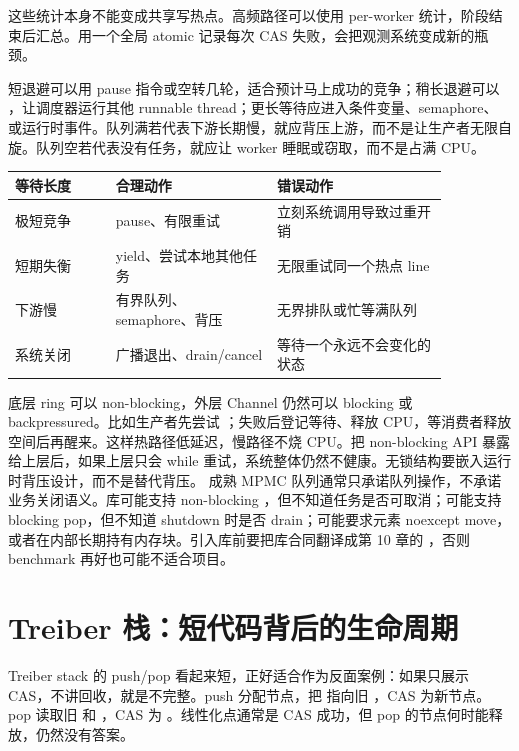 这些统计本身不能变成共享写热点。高频路径可以使用 per-worker 统计，阶段结束后汇总。用一个全局 atomic 记录每次 CAS 失败，会把观测系统变成新的瓶颈。

短退避可以用 pause 指令或空转几轮，适合预计马上成功的竞争；稍长退避可以 ，让调度器运行其他 runnable thread；更长等待应进入条件变量、semaphore、 或运行时事件。队列满若代表下游长期慢，就应背压上游，而不是让生产者无限自旋。队列空若代表没有任务，就应让 worker 睡眠或窃取，而不是占满 CPU。

\begin{center}
\begin{tabular}{p{0.20\linewidth}p{0.32\linewidth}p{0.34\linewidth}}
\toprule
等待长度 & 合理动作 & 错误动作 \\
\midrule
极短竞争 & pause、有限重试 & 立刻系统调用导致过重开销 \\
短期失衡 & yield、尝试本地其他任务 & 无限重试同一个热点 line \\
下游慢 & 有界队列、semaphore、背压 & 无界排队或忙等满队列 \\
系统关闭 & 广播退出、drain/cancel & 等待一个永远不会变化的状态 \\
\bottomrule
\end{tabular}
\end{center}

底层 ring 可以 non-blocking，外层 Channel 仍然可以 blocking 或 backpressured。比如生产者先尝试 ；失败后登记等待、释放 CPU，等消费者释放空间后再醒来。这样热路径低延迟，慢路径不烧 CPU。把 non-blocking API 暴露给上层后，如果上层只会 while 重试，系统整体仍然不健康。无锁结构要嵌入运行时背压设计，而不是替代背压。
成熟 MPMC 队列通常只承诺队列操作，不承诺业务关闭语义。库可能支持 non-blocking ，但不知道任务是否可取消；可能支持 blocking pop，但不知道 shutdown 时是否 drain；可能要求元素 noexcept move，或者在内部长期持有内存块。引入库前要把库合同翻译成第 10 章的 ，否则 benchmark 再好也可能不适合项目。

\section{Treiber 栈：短代码背后的生命周期}

Treiber stack 的 push/pop 看起来短，正好适合作为反面案例：如果只展示 CAS，不讲回收，就是不完整。push 分配节点，把  指向旧 ，CAS  为新节点。pop 读取旧  和 ，CAS  为 。线性化点通常是 CAS 成功，但 pop 的节点何时能释放，仍然没有答案。

